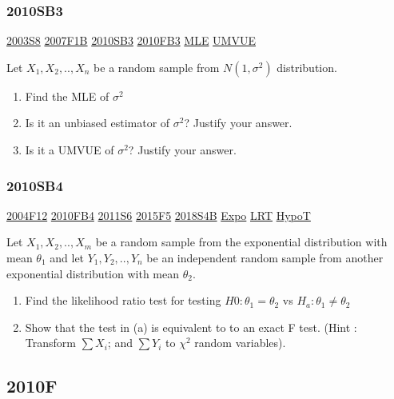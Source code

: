 \documentclass[10pt,twocolumn,portrait]{article}
\begin{document}
\hypertarget{sb3-1}{%
\subsubsection{2010SB3}\label{sb3-1}}

\protect\hyperlink{s8}{2003S8} \protect\hyperlink{f1b}{2007F1B}
\protect\hyperlink{sb3-1}{2010SB3} \protect\hyperlink{fb3-1}{2010FB3}
\protect\hyperlink{MLE}{MLE} \protect\hyperlink{section-5}{UMVUE}

Let \(X_1,X_2,..,X_n\) be a random sample from \(N(1,\sigma^2)\)
distribution.

\begin{enumerate}
\def\labelenumi{(\alph{enumi})}
\item
  Find the MLE of \(\sigma^2\)
\item
  Is it an unbiased estimator of \(\sigma^2\)? Justify your answer.
\item
  Is it a UMVUE of \(\sigma^2\)? Justify your answer.
\end{enumerate}

\hypertarget{sb4}{%
\subsubsection{2010SB4}\label{sb4}}

\protect\hyperlink{f12}{2004F12} \protect\hyperlink{fb4-1}{2010FB4}
\protect\hyperlink{s6-2}{2011S6} \protect\hyperlink{f5-5}{2015F5}
\protect\hyperlink{s4b-2}{2018S4B} \protect\hyperlink{Expo}{Expo}
\protect\hyperlink{LRT}{LRT} \protect\hyperlink{HypoT}{HypoT}

Let \(X_1,X_2,..,X_{m}\) be a random sample from the exponential
distribution with mean \(\theta_1\) and let \(Y_1,Y_2,..,Y_{n}\) be an
independent random sample from another exponential distribution with
mean \(\theta_2\).

\begin{enumerate}
\def\labelenumi{(\alph{enumi})}
\item
  Find the likelihood ratio test for testing \(H0:\theta_1=\theta_2\) vs
  \(H_a:\theta_1\neq\theta_2\)
\item
  Show that the test in (a) is equivalent to to an exact F test. (Hint :
  Transform \(\sum X_i\); and \(\sum Y_i\) to \(\chi^2\) random
  variables).
\end{enumerate}

\hypertarget{f-6}{%
\subsection{2010F}\label{f-6}}
\end{document}
